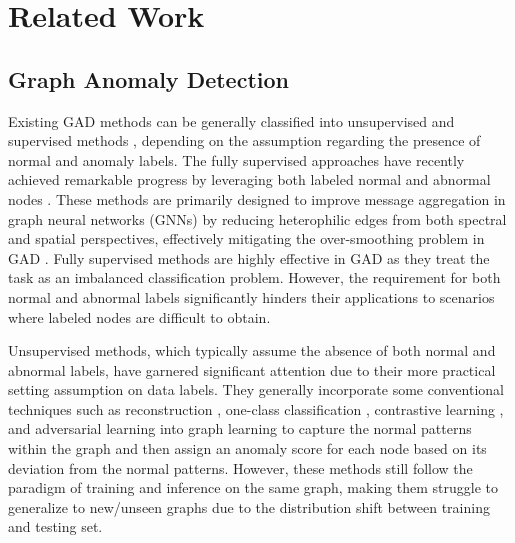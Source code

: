 \section{Related Work}
\subsection{Graph Anomaly Detection} 
Existing GAD methods can be generally classified into unsupervised and supervised methods \cite{ma2021comprehensive, qiao2024deep}, depending on the assumption regarding the presence of normal and anomaly labels.
The fully supervised approaches have recently achieved remarkable progress by leveraging both labeled normal and abnormal nodes \cite{tang2022rethinking, liu2021pick, gao2023addressing, wang2023open}. These methods are primarily designed to improve message aggregation in graph neural networks (GNNs) by reducing heterophilic edges from both spectral and spatial perspectives, effectively mitigating the over-smoothing problem in GAD \cite{tang2023gadbench, qiao2024deep}. Fully supervised methods are highly effective in GAD as they treat the task as an imbalanced classification problem. However, the requirement for both normal and abnormal labels significantly hinders their applications to scenarios where labeled nodes are difficult to obtain.

Unsupervised methods, which typically assume the absence of both normal and abnormal labels, have garnered significant attention due to their more practical setting assumption on data labels. They generally incorporate some conventional techniques such as reconstruction \cite{ding2019deep}, one-class classification \cite{wang2021one, zhou2021subtractive,qiao2024truncated}, contrastive learning \cite{liu2021anomaly, pan2023prem}, and adversarial learning \cite{ding2021inductive} into graph learning to capture the normal patterns within the graph and then assign an anomaly score for each node based on its deviation from the normal patterns. However, these methods still follow the paradigm of training and inference on the same graph, making them struggle to generalize to new/unseen graphs due to the distribution shift between training and testing set.



